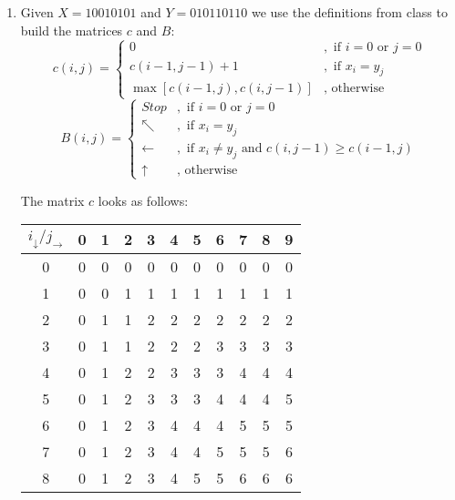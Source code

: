 \documentclass{article}
\begin{document}
\begin{enumerate}[1.]
    
    \item Given $X = 10010101$ and $Y = 010110110$ we use the definitions from class to build the matrices $c$ and $B$:
    \[
    c(i, j)= 
    \begin{cases}
        0                          &, \text{ if } i = 0 \text{ or } j = 0\\
        c(i-1, j-1) + 1            &, \text{ if } x_i = y_j\\
        \max[c(i-1, j), c(i, j-1)] &, \text{ otherwise}
    \end{cases}
    \]
    \[
    B(i, j)= 
    \begin{cases}
        Stop          &, \text{ if } i = 0 \text{ or } j = 0\\
        \nwarrow   &, \text{ if } x_i = y_j\\
        \leftarrow &, \text{ if } x_i \neq y_j \text{ and } c(i, j-1) \geq c(i-1, j)\\
        \uparrow   &, \text{ otherwise}
    \end{cases}
    \]
    
    The matrix $c$ looks as follows:
	\begin{table}[ht]
		\centering
		\begin{tabular}{c|cccccccccc}
			\toprule
			$i_{\downarrow} / j_{\rightarrow}$ & 0 & 1 & 2 & 3 & 4 & 5 & 6 & 7 & 8 & 9 \\
			\midrule
			0 & 0 & 0 & 0 & 0 & 0 & 0 & 0 & 0 & 0 & 0 \\
			1 & 0 & 0 & 1 & 1 & 1 & 1 & 1 & 1 & 1 & 1 \\
			2 & 0 & 1 & 1 & 2 & 2 & 2 & 2 & 2 & 2 & 2 \\
			3 & 0 & 1 & 1 & 2 & 2 & 2 & 3 & 3 & 3 & 3 \\
			4 & 0 & 1 & 2 & 2 & 3 & 3 & 3 & 4 & 4 & 4 \\
			5 & 0 & 1 & 2 & 3 & 3 & 3 & 4 & 4 & 4 & 5 \\
			6 & 0 & 1 & 2 & 3 & 4 & 4 & 4 & 5 & 5 & 5 \\
			7 & 0 & 1 & 2 & 3 & 4 & 4 & 5 & 5 & 5 & 6 \\
			8 & 0 & 1 & 2 & 3 & 4 & 5 & 5 & 6 & 6 & 6 \\
			\bottomrule
		\end{tabular}
	\end{table}
    

\end{enumerate}
\end{document}
